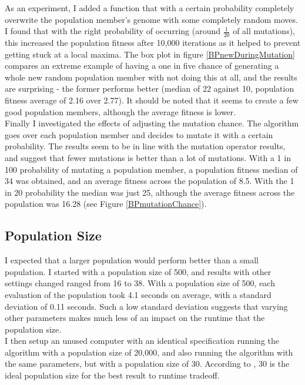 \documentclass[]{report}
\begin{document}
As an experiment, I added a function that with a certain probability completely overwrite the population member's genome with some completely random moves. I found that with the right probability of occurring (around $\frac{1}{20}$ of all mutations), this increased the population fitness after 10,000 iterations as it helped to prevent getting stuck at a local maxima. The box plot in figure \ref{BPnewDuringMutation} compares an extreme example of having a one in five chance of generating a whole new random population member with not doing this at all, and the results are surprising - the former performs better (median of 22 against 10, population fitness average of 2.16 over 2.77). It should be noted that it seems to create a few good population members, although the average fitness is lower.\\

Finally I investigated the effects of adjusting the mutation chance. The algorithm goes over each population member and decides to mutate it with a certain probability. The results seem to be in line with the mutation operator results, and suggest that fewer mutations is better than a lot of mutations. With a 1 in 100 probability of mutating a population member, a population fitness median of 34 was obtained, and an average fitness across the population of 8.5. With the 1 in 20 probability the median was just 25, although the average fitness across the population was 16.28 (see Figure \ref{BPmutationChance}).

\subsection{Population Size}
I expected that a larger population would perform better than a small population. I started with a population size of 500, and results with other settings changed ranged from 16 to 38. With a population size of 500, each evaluation of the population took 4.1 seconds on average, with a standard deviation of 0.11 seconds. Such a low standard deviation suggests that varying other parameters makes much less of an impact on the runtime that the population size.\\

I then setup an unused computer with an identical specification running the algorithm with a population size of 20,000, and also running the algorithm with the same parameters, but with a population size of 30. According to \cite{somePaper}, 30 is the ideal population size for the best result to runtime tradeoff. \\
\end{document}
